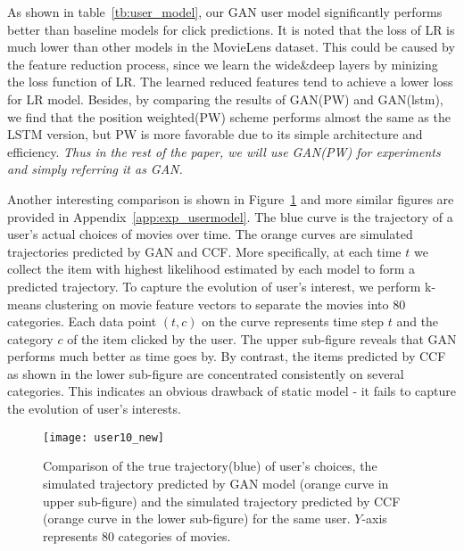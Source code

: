 \documentclass{article} %
\begin{document}
As shown in table~\ref{tb:user_model}, our GAN user model significantly performs better than baseline models for click predictions. It is noted that the loss of LR is much lower than other models in the MovieLens dataset. This could be caused by the feature reduction process, since we learn the wide\&deep layers by minizing the loss function of LR. The learned reduced features tend to achieve a lower loss for LR model. Besides, by comparing the results of GAN(PW) and GAN(lstm), we find that the position weighted(PW) scheme performs almost the same as the LSTM version, but PW is more favorable due to its simple architecture and efficiency. \emph{Thus in the rest of the paper, we will use GAN(PW) for experiments and simply referring it as GAN.}

Another interesting comparison is shown in Figure~\ref{fg:traj} and more similar figures are provided in Appendix~\ref{app:exp_usermodel}. The blue curve is the trajectory of a user's actual choices of movies over time. The orange curves are simulated trajectories predicted by GAN and CCF. More specifically, at each time $t$ we collect the item with highest likelihood estimated by each model to form a predicted trajectory. To capture the evolution of user's interest, we perform k-means clustering on movie feature vectors to separate the movies into 80 categories. Each data point $(t, c)$ on the curve represents time step $t$ and the category $c$ of the item clicked by the user.  The upper sub-figure reveals that GAN performs much better as time goes by. By contrast, the items predicted by CCF as shown in the lower sub-figure are concentrated consistently on several categories. This indicates an obvious drawback of static model - it fails to capture the evolution of user's interests.

\begin{figure}[htbp]
\vspace{-3mm}
  \begin{minipage}[c]{0.6\textwidth}
    \centering
    \texttt{[image: user10\_new]}
  \end{minipage}\hfill
  \begin{minipage}[c]{0.4\textwidth}
    \centering
    \caption{\small Comparison of the true trajectory(blue) of user's choices, the simulated trajectory predicted by GAN model (orange curve in upper sub-figure) and the simulated trajectory predicted by CCF (orange curve in the lower sub-figure) for the same user. $Y$-axis represents 80 categories of movies.
    } \label{fg:traj}
  \end{minipage}
  \vspace{-3mm}
\end{figure}
\end{document}
